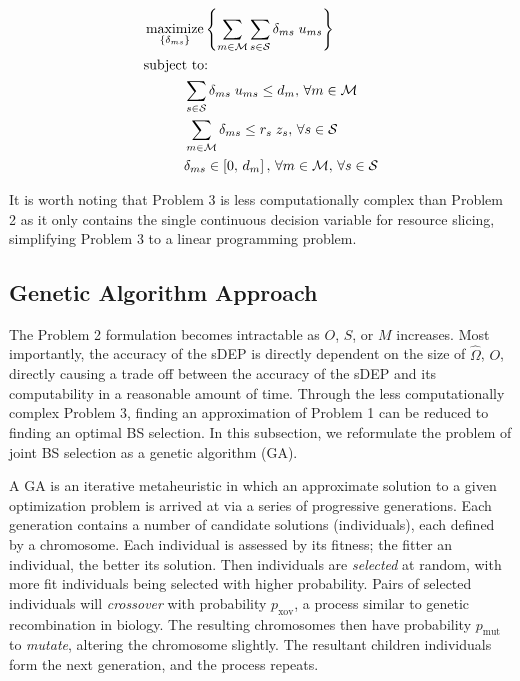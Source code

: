 \documentclass[conference]{IEEEtran}
\DeclareMathOperator*{\argmax}{maximize}
\begin{document}
\begin{tcolorbox}[floatplacement = !ht, float, title = Problem 3: Adaptive Slicing Model]
\begin{align}
& \argmax_{\left\{ \delta_{ms} \right\}} \left\{ \sum_{m \in \mathcal{M}} \sum_{s \in \mathcal{S}} \delta_{ms} \; u_{ms} \right\} \label{eq:ASMO} \\
& \text{subject to:}  \nonumber \\
& \hspace{0.4in} \sum_{s \in \mathcal{S}} \delta_{ms} \; u_{ms} \leq d_m,\, \forall m \in \mathcal{M} \label{eq:ASMC1} \\
& \hspace{0.4in} \sum_{m \in \mathcal{M}} \delta_{ms} \leq r_s \; z_s,\, \forall s \in \mathcal{S} \label{eq:ASMC2} \\
& \hspace{0.4in} \delta_{ms} \in \left[ 0,\, d_m \right],\, \forall m \in \mathcal{M},\, \forall s \in \mathcal{S} \label{eq:ASMC3}
\end{align}
\end{tcolorbox}

It is worth noting that Problem 3 is less computationally complex than Problem 2 as it only contains the single continuous decision variable for resource slicing, simplifying Problem 3 to a linear programming problem.

\subsection{Genetic Algorithm Approach} \label{subsec:ga}

The Problem 2 formulation becomes intractable as $O$, $S$, or $M$ increases.  Most importantly, the accuracy of the sDEP is directly dependent on the size of $\hat{\Omega}$, $O$, directly causing a trade off between the accuracy of the sDEP and its computability in a reasonable amount of time.  Through the less computationally complex Problem 3, finding an approximation of Problem 1 can be reduced to finding an optimal BS selection.  In this subsection, we reformulate the problem of joint BS selection as a genetic algorithm (GA).

A GA is an iterative metaheuristic in which an approximate solution to a given optimization problem is arrived at via a series of progressive generations.  Each generation contains a number of candidate solutions (individuals), each defined by a chromosome.  Each individual is assessed by its fitness; the fitter an individual, the better its solution.  Then individuals are \emph{selected} at random, with more fit individuals being selected with higher probability.  Pairs of selected individuals will \emph{crossover} with probability $p_\text{xov}$, a process similar to genetic recombination in biology.  The resulting chromosomes then have probability $p_\text{mut}$ to \emph{mutate}, altering the chromosome slightly.  The resultant children individuals form the next generation, and the process repeats.
\end{document}
